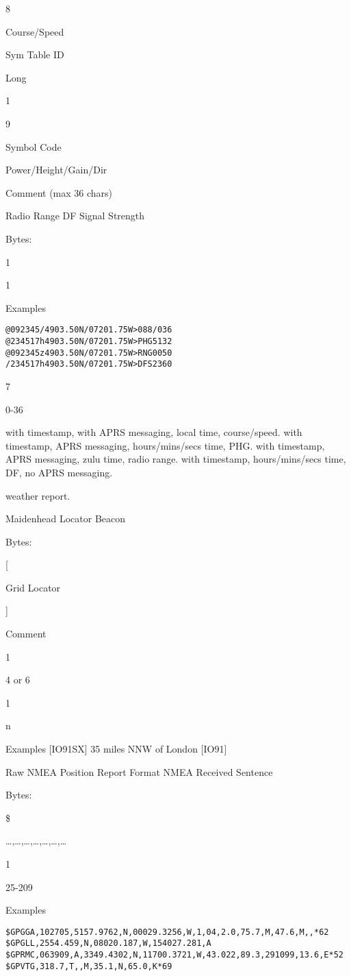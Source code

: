 8

Course/Speed

Sym
Table
ID

Long

1

9

Symbol
Code

Power/Height/Gain/Dir

Comment
(max 36 chars)

Radio Range
DF Signal Strength

Bytes:

1

1

Examples
\begin{verbatim}
@092345/4903.50N/07201.75W>088/036
@234517h4903.50N/07201.75W>PHG5132
@092345z4903.50N/07201.75W>RNG0050
/234517h4903.50N/07201.75W>DFS2360
\end{verbatim}
7

0-36

with timestamp, with APRS messaging, local time,
course/speed.
with timestamp, APRS messaging, hours/mins/secs
time, PHG.
with timestamp, APRS messaging, zulu time, radio
range.
with timestamp, hours/mins/secs time, DF,
no APRS messaging.


weather report.

Maidenhead Locator Beacon

Bytes:

[

Grid Locator

]

Comment

1

4 or 6

1

n

Examples
[IO91SX] 35 miles NNW of London
[IO91]


Raw NMEA Position Report Format
NMEA Received Sentence

Bytes:

\$

…,…,…,…,…,…,…

1

25-209

Examples

\begin{verbatim}
$GPGGA,102705,5157.9762,N,00029.3256,W,1,04,2.0,75.7,M,47.6,M,,*62
$GPGLL,2554.459,N,08020.187,W,154027.281,A
$GPRMC,063909,A,3349.4302,N,11700.3721,W,43.022,89.3,291099,13.6,E*52
$GPVTG,318.7,T,,M,35.1,N,65.0,K*69
\end{verbatim}

